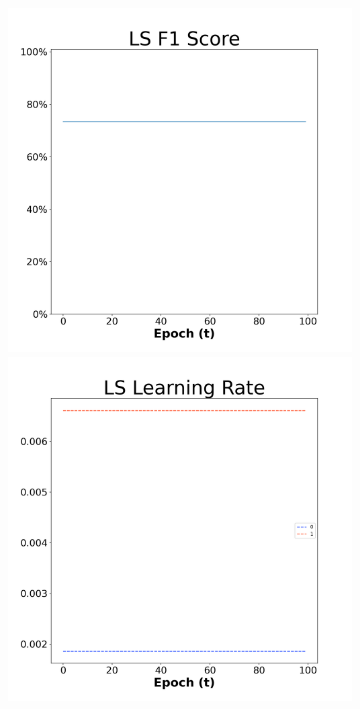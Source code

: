 \begin{figure}[H]
    \centering %
\begin{subfigure}{0.3\textwidth}
  \includegraphics[width=\linewidth]{images/exper2/SP/LS_0.01_f1.png}
    \includegraphics[width=\linewidth]{images/exper2/SP/LS_0.01_lr.png}

\end{subfigure}
\end{figure}

